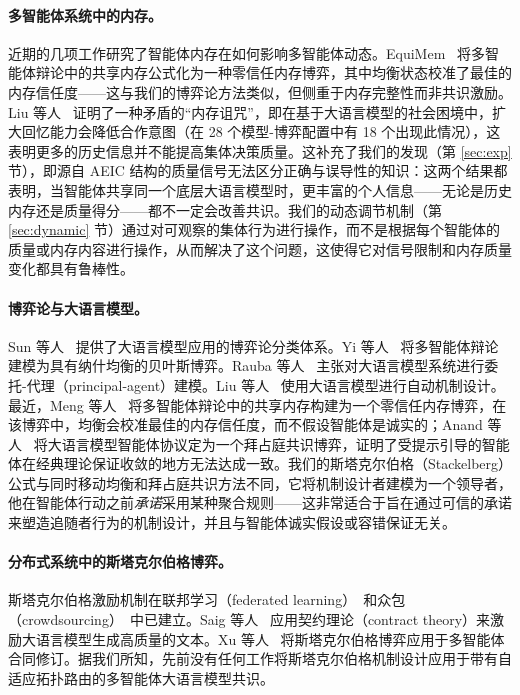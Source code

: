 \paragraph{多智能体系统中的内存。}
近期的几项工作研究了智能体内存在如何影响多智能体动态。EquiMem~\cite{meng2026equimem} 将多智能体辩论中的共享内存公式化为一种零信任内存博弈，其中均衡状态校准了最佳的内存信任度——这与我们的博弈论方法类似，但侧重于内存完整性而非共识激励。Liu 等人~\cite{liu2025memorycurse} 证明了一种矛盾的“内存诅咒”，即在基于大语言模型的社会困境中，扩大回忆能力会降低合作意图（在 28 个模型-博弈配置中有 18 个出现此情况），这表明更多的历史信息并不能提高集体决策质量。这补充了我们的发现（第 \ref{sec:exp} 节），即源自 AEIC 结构的质量信号无法区分正确与误导性的知识：这两个结果都表明，当智能体共享同一个底层大语言模型时，更丰富的个人信息——无论是历史内存还是质量得分——都不一定会改善共识。我们的动态调节机制（第 \ref{sec:dynamic} 节）通过对可观察的集体行为进行操作，而不是根据每个智能体的质量或内存内容进行操作，从而解决了这个问题，这使得它对信号限制和内存质量变化都具有鲁棒性。

\paragraph{博弈论与大语言模型。}
Sun 等人~\cite{sun2025gametheory} 提供了大语言模型应用的博弈论分类体系。Yi 等人~\cite{yi2025debate} 将多智能体辩论建模为具有纳什均衡的贝叶斯博弈。Rauba 等人~\cite{rauba2025principal} 主张对大语言模型系统进行委托-代理（principal-agent）建模。Liu 等人~\cite{liu2025interpretable} 使用大语言模型进行自动机制设计。最近，Meng 等人~\cite{meng2026equimem} 将多智能体辩论中的共享内存构建为一个零信任内存博弈，在该博弈中，均衡会校准最佳的内存信任度，而不假设智能体是诚实的；Anand 等人~\cite{anand2026resilient} 将大语言模型智能体协议定为一个拜占庭共识博弈，证明了受提示引导的智能体在经典理论保证收敛的地方无法达成一致。我们的斯塔克尔伯格（Stackelberg）公式与同时移动均衡和拜占庭共识方法不同，它将机制设计者建模为一个领导者，他在智能体行动之前\emph{承诺}采用某种聚合规则——这非常适合于旨在通过可信的承诺来塑造追随者行为的机制设计，并且与智能体诚实假设或容错保证无关。

\paragraph{分布式系统中的斯塔克尔伯格博弈。}
斯塔克尔伯格激励机制在联邦学习（federated learning）~\cite{fu2024stackelberg,guo2023incentive}和众包（crowdsourcing）~\cite{wang2024incentive}中已建立。Saig 等人~\cite{saig2024incentivizing} 应用契约理论（contract theory）来激励大语言模型生成高质量的文本。Xu 等人~\cite{xu2026rcbsf} 将斯塔克尔伯格博弈应用于多智能体合同修订。据我们所知，先前没有任何工作将斯塔克尔伯格机制设计应用于带有自适应拓扑路由的多智能体大语言模型共识。

